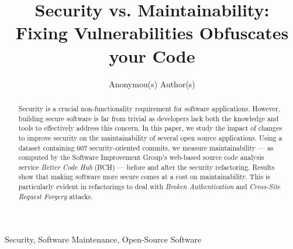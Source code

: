 \documentclass[10pt,conference]{IEEEtran}
\begin{document}
\title{Security vs. Maintainability: \\ Fixing Vulnerabilities Obfuscates your Code}

\author{
    Anonymou(s) Author(s)
}

\maketitle

\begin{abstract}
  Security is a crucial non-functionality requirement for software applications.
  However, building secure software is far from trivial as developers lack both
  the knowledge and tools to effectively address this concern. In this paper, we
  study the impact of changes to improve security on the maintainability of several
  open source applications. Using a dataset containing 607 security-oriented
  commits, we measure maintainability --- as computed by the Software Improvement
  Group's web-based source code analysis service \emph{Better Code Hub} (BCH) ---
  before and after the security refactoring. Results show that making software
  more secure comes at a cost on maintainability. This is particularly evident
  in refactorings to deal with \textit{Broken Authentication} and \textit{Cross-Site Request Forgery} attacks.
\end{abstract}

\begin{IEEEkeywords}
Security, Software Maintenance, Open-Source Software
\end{IEEEkeywords}
\end{document}

